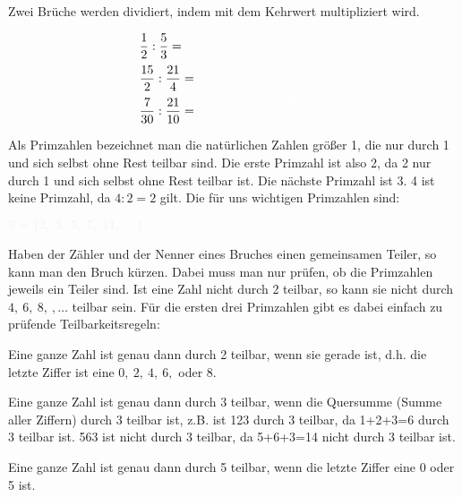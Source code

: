 \begin{tcolorbox}
	Zwei Brüche werden dividiert, indem mit dem Kehrwert multipliziert wird.
\end{tcolorbox}
\begin{bsp}
	\begin{align*}
		&\frac{1}{2}:\frac{5}{3}=\textcolor{loes}{\frac{1}{2}\cdot\frac{3}{5}=\frac{3}{10}}\\
		&\frac{15}{2}:\frac{21}{4}=\textcolor{loes}{\frac{15}{2}\cdot\frac{4}{21}=\frac{\cancel{15}^5\cdot\cancel{4}^2}{\cancel{21}^7\cdot \cancel{3}}=\frac{10}{7}}\\
		&\frac{7}{30}:\frac{21}{10}=\textcolor{loes}{\frac{7}{30}\cdot\frac{10}{21}=\frac{\cancel{7}^1\cdot\cancel{10}^1}{\cancel{30}^3\cdot\cancel{21}^3}=\frac{1}{9}}
	\end{align*}
\end{bsp}
\newpage
Als Primzahlen bezeichnet man die natürlichen Zahlen größer 1, die nur durch 1 und sich selbst ohne Rest teilbar sind. Die erste Primzahl ist also 2, da 2 nur durch 1 und sich selbst ohne Rest teilbar ist. Die nächste Primzahl ist 3. 4 ist keine Primzahl, da \(4:2=2\) gilt. Die für uns wichtigen Primzahlen sind:
\begin{tcolorbox}\centering
	\(\textcolor{loestc}{\mathbb{P}=\{2,\ 3,\ 5,\ 7,\ 11,\dots\}}\)
\end{tcolorbox}
Haben der Zähler und der Nenner eines Bruches einen gemeinsamen Teiler, so kann man den Bruch kürzen. Dabei muss man nur prüfen, ob die Primzahlen jeweils ein Teiler sind. Ist eine Zahl nicht durch 2 teilbar, so kann sie nicht durch \(4,\ 6,\ 8,\ ,\dots\) teilbar sein. Für die ersten drei Primzahlen gibt es dabei einfach zu prüfende Teilbarkeitsregeln:
\begin{tcolorbox}\centering
	\textcolor{loestc}{Eine ganze Zahl ist genau dann durch 2 teilbar, wenn sie gerade ist, d.h. die letzte Ziffer ist eine \(0,\ 2,\ 4,\ 6,\) oder  \(8\).}
\end{tcolorbox}
\begin{tcolorbox}\centering
	\textcolor{loestc}{Eine ganze Zahl ist genau dann durch 3 teilbar, wenn die Quersumme (Summe aller Ziffern) durch 3 teilbar ist, z.B. ist 123 durch 3 teilbar, da 1+2+3=6 durch 3 teilbar ist. 563 ist nicht durch 3 teilbar, da 5+6+3=14 nicht durch 3 teilbar ist.}
\end{tcolorbox}
\begin{tcolorbox}\centering
	\textcolor{loestc}{Eine ganze Zahl ist genau dann durch 5 teilbar, wenn die letzte Ziffer eine 0 oder 5 ist.}
\end{tcolorbox}
